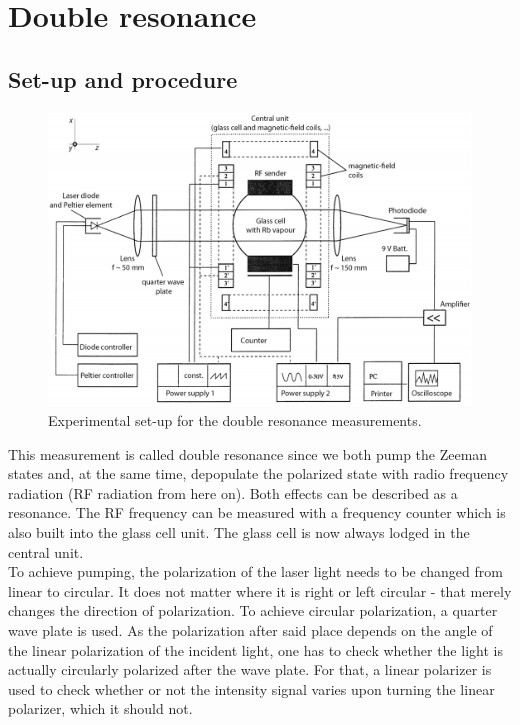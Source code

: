 \section{Double resonance}
\subsection{Set-up and procedure}
\begin{figure}[htb]
\centering
\includegraphics[width=1.0\linewidth]{graphics/doubleresonancesetup}
\caption[Double resonance set-up]{Experimental set-up for the double resonance measurements.\cite{anleitung}}
\label{fig:doubleresonancesetup}
\end{figure}
This measurement is called double resonance since we both pump the Zeeman states and, at the same time, depopulate the polarized state with radio frequency radiation (RF radiation from here on). Both effects can be described as a resonance. The RF frequency can be measured with a frequency counter which is also built into the glass cell unit.  The glass cell is now always lodged in the central unit.\\
To achieve pumping, the polarization of the laser light needs to be changed from linear to circular. It does not matter where it is right or left circular - that merely changes the direction of polarization. To achieve circular polarization, a quarter wave plate is used. As the polarization after said place depends on the angle of the linear polarization of the incident light, one has to check whether the light is actually circularly polarized after the wave plate. For that, a linear polarizer is used to check whether or not the intensity signal varies upon turning the linear polarizer, which it should not.\\ 
